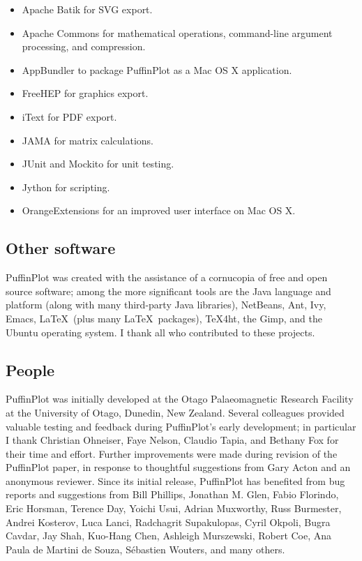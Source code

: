 \documentclass[a4paper,british]{article}
\newcommand{\caps}[1]{\MakeTextUppercase{#1}} %
\begin{document}
\begin{itemize}
  
\item Apache Batik for \caps{svg} export.

\item Apache Commons for mathematical operations, command-line argument
  processing, and compression.

\item AppBundler to package PuffinPlot as a Mac OS X application.

\item FreeHEP for graphics export.

\item iText for \caps{pdf} export.

\item JAMA for matrix calculations.

\item JUnit and Mockito for unit testing.

\item Jython for scripting.

\item OrangeExtensions for an improved user interface on Mac OS X.
  
\end{itemize}

\subsection*{Other software}

PuffinPlot was created with the assistance of a cornucopia of free and
open source software; among the more significant tools are the Java
language and platform (along with many third-party Java libraries),
NetBeans, Ant, Ivy, Emacs, \LaTeX\ (plus many \LaTeX\ packages), TeX4ht,
the Gimp, and the Ubuntu operating system. I thank all who contributed
to these projects.

\subsection*{People}

PuffinPlot was initially developed at the Otago Palaeomagnetic Research
Facility at the University of Otago, Dunedin, New Zealand. Several
colleagues provided valuable testing and feedback during PuffinPlot's
early development; in particular I thank Christian Ohneiser, Faye Nelson,
Claudio Tapia, and Bethany Fox for their time and effort. Further
improvements were made during revision of the PuffinPlot paper, in
response to thoughtful suggestions from Gary Acton and an anonymous
reviewer. Since its initial release, PuffinPlot has benefited from bug
reports and suggestions from Bill Phillips, Jonathan M. Glen, Fabio
Florindo, Eric Horsman, Terence Day, Yoichi Usui, Adrian Muxworthy, Russ
Burmester, Andrei Kosterov, Luca Lanci, Radchagrit Supakulopas, Cyril
Okpoli, Bugra Cavdar, Jay Shah, Kuo-Hang Chen, Ashleigh Murszewski, Robert
Coe, Ana Paula de Martini de Souza, Sébastien Wouters, and many others.
\end{document}
